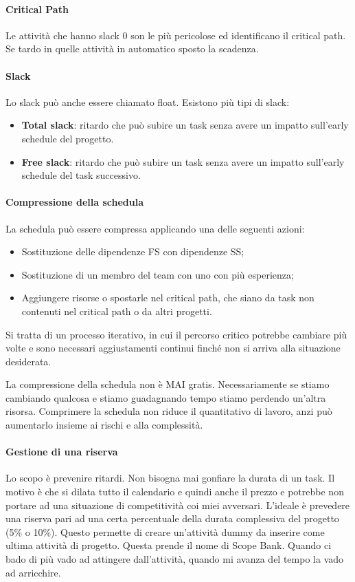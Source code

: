 \paragraph{Critical Path}
Le attività che hanno slack 0 son le più pericolose ed identificano il critical path. Se tardo in quelle attività in automatico sposto la scadenza.
\paragraph{Slack}
Lo slack può anche essere chiamato float. Esistono più tipi di slack:
\begin{itemize}
	\item \textbf{Total slack}: ritardo che può subire un task senza avere un impatto sull'early schedule del progetto.
	\item \textbf{Free slack}: ritardo che può subire un task senza avere un impatto sull'early schedule del task successivo.
\end{itemize}

\paragraph{Compressione della schedula}
La schedula può essere compressa applicando una delle seguenti azioni:
\begin{itemize}
	\item Sostituzione delle dipendenze FS con dipendenze SS;
	\item Sostituzione di un membro del team con uno con più esperienza;
	\item Aggiungere risorse o spostarle nel critical path, che siano da task non contenuti nel critical path o da altri progetti.
\end{itemize}
Si tratta di un processo iterativo, in cui il percorso critico potrebbe cambiare più volte e sono necessari aggiustamenti continui finché non si arriva alla situazione desiderata.

\noindent La compressione della schedula non è MAI gratis. Necessariamente se stiamo cambiando qualcosa e stiamo guadagnando tempo stiamo perdendo un'altra risorsa. Comprimere la schedula non riduce il quantitativo di lavoro, anzi può aumentarlo insieme ai rischi e alla complessità.

\paragraph{Gestione di una riserva}
Lo scopo è prevenire ritardi. Non bisogna mai gonfiare la durata di un task. Il motivo è che si dilata tutto il calendario e quindi anche il prezzo e potrebbe non portare ad una situazione di competitività coi miei avversari. L'ideale è prevedere una riserva pari ad una certa percentuale della durata complessiva del progetto (5\% o 10\%). Questo permette di creare un'attività dummy da inserire come ultima attività di progetto. Questa prende il nome di Scope Bank. Quando ci bado di più vado ad attingere dall'attività, quando mi avanza del tempo la vado ad arricchire.

